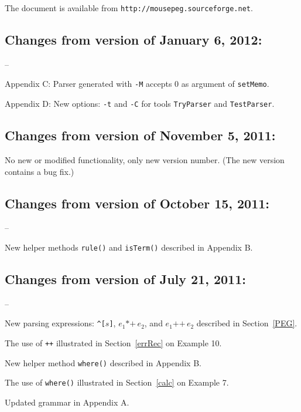 \documentclass[a4paper,fleqn]{article}
\newcommand{\tx}[1]{\texttt{#1}}
\newcommand{\ul}
{\begin{list}
{--}
 {\setlength{\topsep}{0.5ex}
  \setlength{\itemsep}{0ex}
  \setlength{\parsep}{0ex}
  \setlength{\itemindent}{0em}
  \setlength{\labelwidth}{1em}
  \setlength{\labelsep}{0.5em}
  \setlength{\leftmargin}{1.5em}
 }
}
\newcommand{\eul}{\end{list}}
\begin{document}
\noindent
The document is available from \tx{http://mousepeg.sourceforge.net}.
\newpage
\tableofcontents

\newpage
{}
\subsection*{Changes from version of January 6, 2012:}
\ul
\item Appendix C: Parser generated with \tx{-M} accepts 0 as argument of \tx{setMemo}.
\item Appendix D: New options: \tx{-t} and \tx{-C}
      for tools \tx{TryParser} and \tx{TestParser}.
\eul
\subsection*{Changes from version of November 5, 2011:}
No new or modified functionality, only new version number.
(The new version contains a bug fix.)
\subsection*{Changes from version of October 15, 2011:}
\ul
\item New helper methods \tx{rule()} and \tx{isTerm()} described in Appendix B.
\eul
\subsection*{Changes from version of July 21, 2011:}
\ul
\item New parsing expressions: \tx{\textasciicircum[}$s$\tx{]}, 
      $e_1\tx{*+}\,e_2$, and $e_1\tx{++}\,e_2$  
      described in Section~\ref{PEG}.
\item The use of \tx{++} illustrated in Section~\ref{errRec} on Example 10.
\item New helper method \tx{where()} described in Appendix B.
\item The use of \tx{where()} illustrated in Section~\ref{calc}
      on Example 7.
\item Updated grammar in Appendix A.      
\eul

\newpage
\pagestyle{plain}
\setcounter{page}{1}




\end{document}
